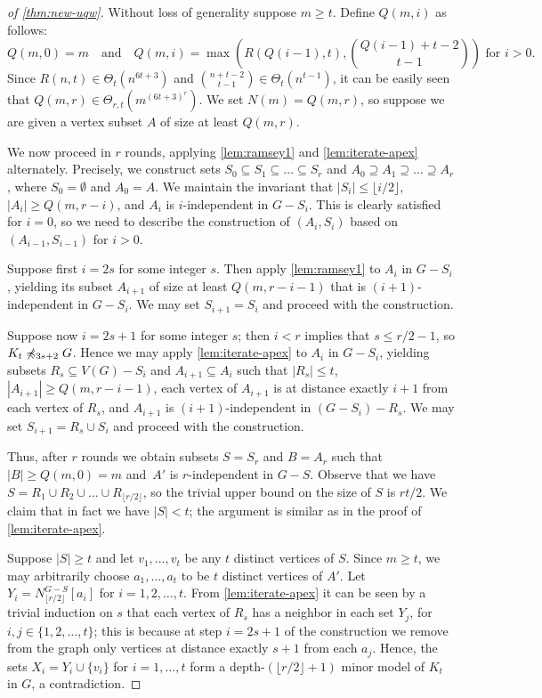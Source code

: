 \begin{proof}[of \cref{thm:new-uqw}]
Without loss of generality suppose $m\geq t$.
Define $Q(m,i)$ as follows: $$Q(m,0)=m\quad\textrm{and}\quad Q(m,i)=\max \left (R(Q(i-1),t),\binom{Q(i-1)+t-2}{t-1}\right)\textrm{ for }i>0.$$
Since $R(n,t)\in \Theta_{t}(n^{6t+3})$ and $\binom{n+t-2}{t-1}\in \Theta_t(n^{t-1})$, it can be easily seen that $Q(m,r)\in \Theta_{r,t}(m^{(6t+3)^r})$.
We set $N(m)=Q(m,r)$, so suppose we are given a vertex subset $A$ of size at least $Q(m,r)$.

We now proceed in $r$ rounds, applying \cref{lem:ramsey1} and \cref{lem:iterate-apex} alternately.
Precisely, we construct sets $S_0\subseteq S_1\subseteq \ldots\subseteq S_r$ and $A_0\supseteq A_1\supseteq \ldots\supseteq A_r$, where $S_0=\emptyset$ and $A_0=A$.
We maintain the invariant that $|S_i|\leq \lfloor i/2\rfloor$, $|A_i|\geq Q(m,r-i)$, and $A_i$ is $i$-independent in $G-S_i$. This is clearly satisfied for $i=0$, so we need to describe the construction
of $(A_i,S_i)$ based on $(A_{i-1},S_{i-1})$ for $i>0$.

Suppose first $i=2s$ for some integer $s$. Then apply \cref{lem:ramsey1} to $A_i$ in $G-S_i$, yielding its subset $A_{i+1}$ of size at least $Q(m,r-i-1)$ that is $(i+1)$-independent in $G-S_i$. We may set $S_{i+1}=S_i$
and proceed with the construction.

Suppose now $i=2s+1$ for some integer $s$; then $i<r$ implies that $s\leq r/2-1$, so $K_{t}\not\preccurlyeq_{3s+2} G$. 
Hence we may apply \cref{lem:iterate-apex} to $A_i$ in $G-S_i$, yielding subsets $R_{s}\subseteq V(G)-S_i$ and $A_{i+1}\subseteq A_i$ 
such that $|R_{s}|\leq t$, $|A_{i+1}|\geq Q(m,r-i-1)$, each vertex of $A_{i+1}$ is at distance exactly $i+1$ from each vertex of $R_s$, and $A_{i+1}$ is $(i+1)$-independent in $(G-S_{i})-R_s$.
We may set $S_{i+1}=R_s\cup S_i$ and proceed with the construction.

Thus, after $r$ rounds we obtain subsets $S=S_r$ and $B=A_r$ such that $|B|\geq Q(m,0)=m$ and~$A'$ is $r$-independent in $G-S$. Observe that we have $S=R_1\cup R_2\cup \ldots\cup R_{\lfloor r/2\rfloor}$,
so the trivial upper bound on the size of $S$ is $rt/2$. We claim that in fact we have $|S|<t$; the argument is similar as in the proof of \cref{lem:iterate-apex}.

Suppose $|S|\geq t$ and let $v_1,\ldots,v_t$ be any $t$ distinct vertices of $S$.
Since $m\geq t$, we may arbitrarily choose $a_1,\ldots,a_t$ to be $t$ distinct vertices of $A'$.
Let $Y_i=N^{G-S}_{\lfloor r/2\rfloor}[a_i]$ for $i=1,2,\ldots,t$.
From \cref{lem:iterate-apex} it can be seen by a trivial induction on $s$ that each vertex of $R_s$ has a neighbor in each set $Y_j$, for $i,j\in \{1,2,\ldots,t\}$; 
this is because at step $i=2s+1$ of the construction we remove from the graph only vertices at distance exactly $s+1$ from each $a_j$.
Hence, the sets $X_i=Y_i\cup \{v_i\}$ for $i=1,\ldots,t$ form a depth-$(\lfloor r/2\rfloor+1)$ minor model of $K_t$ in $G$, a contradiction. 
\end{proof}

